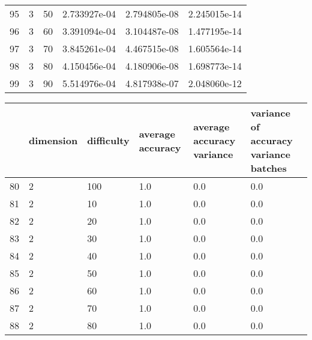 \documentclass{article}
\begin{document}
\begin{center}
\begin{tabular}{llllll}
95 &         3 &         50 &  2.733927e-04 &          2.794805e-08 &                      2.245015e-14 \\
96 &         3 &         60 &  3.391094e-04 &          3.104487e-08 &                      1.477195e-14 \\
97 &         3 &         70 &  3.845261e-04 &          4.467515e-08 &                      1.605564e-14 \\
98 &         3 &         80 &  4.150456e-04 &          4.180906e-08 &                      1.698773e-14 \\
99 &         3 &         90 &  5.514976e-04 &          4.817938e-07 &                      2.048060e-12 \\
\bottomrule
\end{tabular}
\end{center}
\begin{center}
\begin{tabular}{llllll}
\toprule
{} & dimension & difficulty &    average accuracy & average accuracy variance & variance of accuracy variance batches \\
\midrule
80 &         2 &        100 &                 1.0 &                       0.0 &                                   0.0 \\
81 &         2 &         10 &                 1.0 &                       0.0 &                                   0.0 \\
82 &         2 &         20 &                 1.0 &                       0.0 &                                   0.0 \\
83 &         2 &         30 &                 1.0 &                       0.0 &                                   0.0 \\
84 &         2 &         40 &                 1.0 &                       0.0 &                                   0.0 \\
85 &         2 &         50 &                 1.0 &                       0.0 &                                   0.0 \\
86 &         2 &         60 &                 1.0 &                       0.0 &                                   0.0 \\
87 &         2 &         70 &                 1.0 &                       0.0 &                                   0.0 \\
88 &         2 &         80 &                 1.0 &                       0.0 &                                   0.0 \\

\end{tabular}
\end{center}
\end{document}
